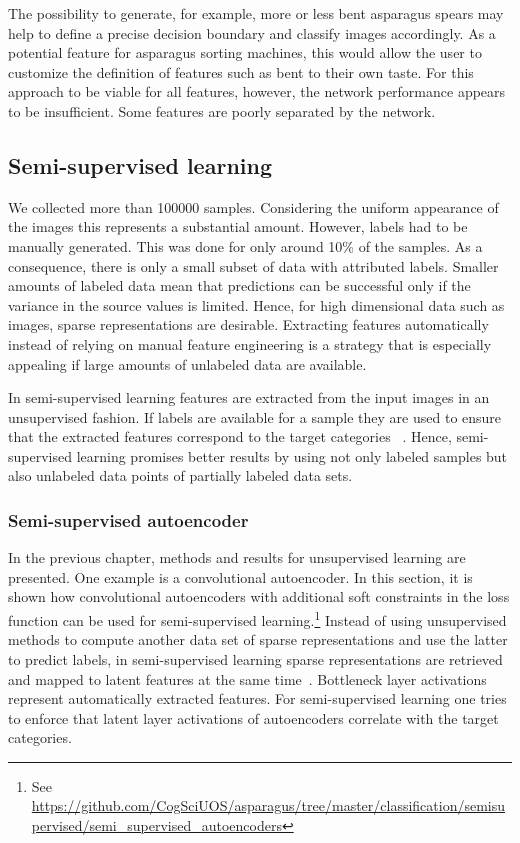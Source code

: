 The possibility to generate, for example, more or less bent asparagus spears may help to define a precise decision boundary and classify images accordingly. As a potential feature for asparagus sorting machines, this would allow the user to customize the definition of features such as bent to their own taste. For this approach to be viable for all features, however, the network performance appears to be insufficient. Some features are poorly separated by the network.


\subsection{Semi-supervised learning}
\label{sec:SemiSupervisedLearning}

We collected more than 100000 samples. Considering the uniform appearance of the images this represents a substantial amount. However, labels had to be manually generated. This was done for only around 10\% of the samples. As a consequence, there is only a small subset of data with attributed labels. Smaller amounts of labeled data mean that predictions can be successful only if the variance in the source values is limited. Hence, for high dimensional data such as images, sparse representations are desirable. Extracting features automatically instead of relying on manual feature engineering is a strategy that is especially 
appealing if large amounts of unlabeled data are available.

In semi-supervised learning features are extracted from the input images in an unsupervised fashion. If labels are available for a sample they are used to ensure that the extracted features correspond to the target categories  ~\citep{keng2017semi}. Hence, semi-supervised learning promises better results by using not only labeled samples but also unlabeled data points of partially labeled data sets.


\subsubsection{Semi-supervised autoencoder}
\label{subsec:VariationalAutoencoder}

In the previous chapter, methods and results for unsupervised learning are presented. One example is a convolutional autoencoder. In this section, it is shown how convolutional autoencoders with additional soft constraints in the loss function can be used for semi-supervised learning.\footnote{See \url{https://github.com/CogSciUOS/asparagus/tree/master/classification/semisupervised/semi_supervised_autoencoders}} Instead of using unsupervised methods to compute another data set of sparse representations and use the latter to predict labels, in semi-supervised learning sparse representations are retrieved and mapped to latent features at the same time~\citep{keng2017semi}. Bottleneck layer activations represent automatically extracted features. For semi-supervised learning one tries to enforce that latent layer activations of autoencoders correlate with the target categories.

